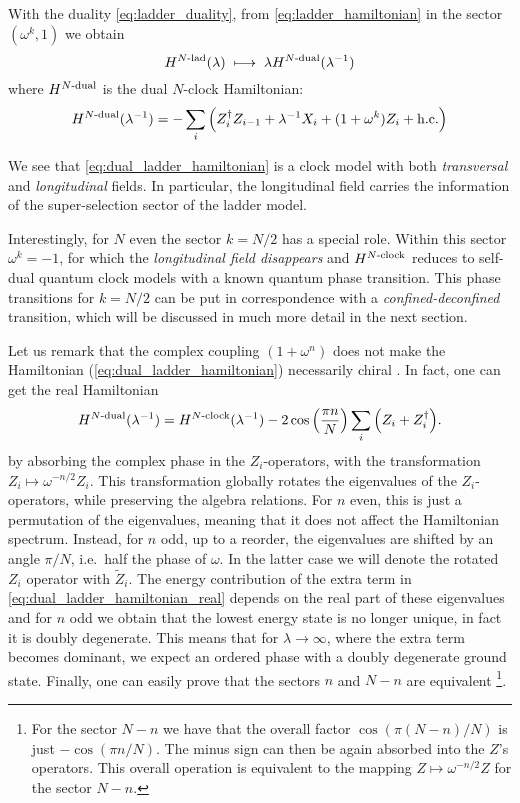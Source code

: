 With the duality \eqref{eq:ladder_duality}, from \eqref{eq:ladder_hamiltonian} in the sector $(\omega^k, 1)$ we obtain
\begin{equation}
    H^{N\text{-lad}}(\lambda) \; \longmapsto \; \lambda H^{N\text{-dual}}(\lambda^{-1})
\end{equation}
where $H^{N\text{-dual}}$ is the dual $N$-clock Hamiltonian:
\begin{equation}
    H^{N\text{-dual}}(\lambda^{-1}) =
    - \sum_{i} \qty(
        Z_i^\dagger Z_{i-1}
        + \lambda^{-1}  X_i
        + (1 + \omega^k)  Z_i
        + \text{h.c.}
    )
    \label{eq:dual_ladder_hamiltonian}
\end{equation}

We see that \eqref{eq:dual_ladder_hamiltonian} is a clock model with both \emph{transversal} and \emph{longitudinal} fields.
In particular, the longitudinal field carries the information of the super-selection sector of the ladder model.

Interestingly, for $N$ even the sector $k = N/2$ has a special role.
Within this sector $\omega^k = -1$, for which the \emph{longitudinal field disappears} and $H^{N\text{-clock}}$ reduces to self-dual quantum clock models with a known quantum phase transition.
This phase transitions for $k = N/2$ can be put in correspondence with a \emph{confined-deconfined} transition, which will be discussed in much more detail in the next section.

Let us remark that the complex coupling $(1 + \omega^n)$ does not make the Hamiltonian  (\ref{eq:dual_ladder_hamiltonian}) necessarily chiral \cite{fendley2012parafermions, whitsitt2018clock}.
In fact, one can get the real Hamiltonian
\begin{equation}
    \HamilDual(\lambda^{-1}) = \HamilClock(\lambda^{-1}) - 2 \cos \pqty{\frac{\pi n}{N}} \sum_{i} \pqty{Z_i + Z_i^{\dagger}}.
    \label{eq:dual_ladder_hamiltonian_real}
\end{equation}
by absorbing the complex phase in the $Z_i$-operators, with the transformation $Z_i \mapsto \omega^{-n/2} Z_i$. This transformation globally rotates the eigenvalues of the $Z_i$-operators, while preserving the algebra relations.
For $n$ even, this is just a permutation of the eigenvalues, meaning that it does not affect the Hamiltonian spectrum.
Instead, for $n$ odd, up to a reorder, the eigenvalues are shifted by an angle $\pi/N$, i.e.~half the phase of $\omega$.
In the latter case we will denote the rotated $Z_i$ operator with $\tilde{Z}_i$.
The energy contribution of the extra term in \eqref{eq:dual_ladder_hamiltonian_real}  depends on the real part of these eigenvalues and for $n$ odd we obtain that the lowest energy state is no longer unique, in fact it is doubly degenerate.
This means that for $\lambda \to \infty$, where the extra term becomes dominant, we expect an ordered phase with a doubly degenerate ground state.
Finally, one can easily prove that the sectors $n$ and $N-n$ are equivalent
\footnote{For the sector $N-n$ we have that the overall factor $\cos(\pi(N-n)/N)$ is just $-\cos(\pi n/N)$.
The minus sign can then be again absorbed into the $Z$'s operators.
This overall operation is equivalent to the mapping $Z \mapsto \omega^{-n/2} Z$ for the sector $N-n$.}.


